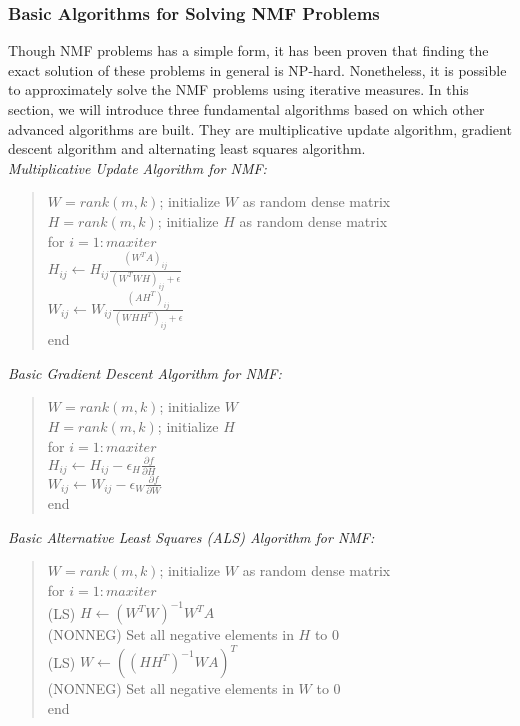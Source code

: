 \documentclass[12pt,letterpaper]{article}
\begin{document}
\subsubsection{Basic Algorithms for Solving NMF Problems}
Though NMF problems has a simple form, it has been proven that finding the exact solution of these problems in general is NP-hard. Nonetheless, it is possible to approximately solve the NMF problems using iterative measures. In this section, we will introduce three fundamental algorithms based on which other advanced algorithms are built. They are multiplicative update algorithm, gradient descent algorithm and alternating least squares algorithm. \\

\noindent \textit{Multiplicative Update Algorithm for NMF:} 
\begin{quotation}
	\noindent $W = rank(m, k)$; initialize $W$ as random dense matrix \\
	$H = rank(m, k)$; initialize $H$ as random dense matrix \\
	for $i = 1 : maxiter$ \\
	\indent $H_{ij} \leftarrow H_{ij} \frac{(W^TA)_{ij}}{(W^TWH)_{ij} + \epsilon}$ \\
	\indent $W_{ij} \leftarrow W_{ij} \frac{(AH^T)_{ij}}{(WHH^T)_{ij} + \epsilon}$ \\
	end
\end{quotation}
\noindent \textit{Basic Gradient Descent Algorithm for NMF:}
\begin{quotation}
	\noindent $W = rank(m, k)$; initialize $W$\\
	$H = rank(m, k)$; initialize $H$\\
	for $i = 1 : maxiter$ \\
	\indent $H_{ij} \leftarrow H_{ij} - \epsilon_H\frac{\partial f}{\partial H}$ \\
	\indent $W_{ij} \leftarrow W_{ij} - \epsilon_W\frac{\partial f}{\partial W}$ \\
	end
\end{quotation}
\noindent \textit{Basic Alternative Least Squares (ALS) Algorithm for NMF:}
\begin{quotation}
	\noindent $W = rank(m, k)$; initialize $W$ as random dense matrix\\
	for $i = 1 : maxiter$ \\
	\indent (LS) \indent\indent\indent $H \leftarrow (W^TW)^{-1}W^TA$ \\
	\indent (NONNEG) \indent Set all negative elements in $H$ to 0 \\
	\indent (LS) \indent\indent\indent $W \leftarrow ((HH^T)^{-1}WA)^T$ \\
	\indent (NONNEG) \indent Set all negative elements in $W$ to 0 \\
	end
\end{quotation}
\end{document}
